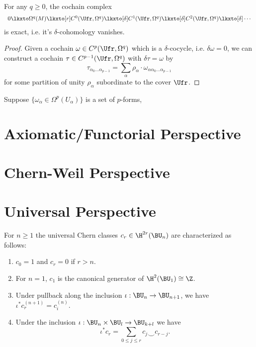 \begin{theorem}
	For any $q \geq 0$, the cochain complex
	\[
		\begin{array}{rcl}
			0 \lkxto \Omega^q(M) \lkxto[r] C^0(\Ufr, \Omega^q) \lkxto[\delta]
			C^1(\Ufr, \Omega^q) \lkxto[\delta] C^2(\Ufr, \Omega^q) \lkxto[\delta]\cdots
		\end{array}
	\]
	is exact, i.e. it's $\delta$-cohomology vanishes.
\end{theorem}

\begin{proof}
	Given a cochain $\omega\in C^p(\Ufr, \Omega^q)$ which is a $\delta$-cocycle, i.e. $\delta \omega = 0$, we can construct a cochain $\tau\in C^{p-1}(\Ufr, \Omega^q)$ with $\delta\tau = \omega$ by
	\[
		\tau_{\alpha_0\ldots\alpha_{p-1}} = \sum_{\alpha}\rho_\alpha\cdot \omega_{\alpha\alpha_0\ldots\alpha_{p-1}}
	\]
	for some partition of unity $\rho_\alpha$ subordinate to the cover $\Ufr$.
\end{proof}

\begin{corollary}
	Suppose $\{\omega_\alpha\in \Omega^p(U_\alpha)\}$ is a set of $p$-forms,
\end{corollary}

\section{Axiomatic/Functorial Perspective}

\section{Chern-Weil Perspective}

\section{Universal Perspective}

\begin{definition}
	For $n\geq 1$ the universal Chern classes $c_r \in \H^{2r}(\BU_n)$
	are characterized as follows:
	\begin{enumerate}
		\item $c_0 = 1$ and $c_r = 0$ if $r > n$.
		\item For $n=1$, $c_1$ is the canonical generator of $\H^2(\BU_1)\cong \Z$.
		\item Under pullback along the inclusion $\iota : \BU_n \to \BU_{n+1}$, we have $\iota^* c_r^{(n+1)} = c_i^{(n)}$.
		\item Under the inclusion $\iota : \BU_n\times \BU_l \to \BU_{k+l}$ we have
		      \[
			      \iota^* c_r = \sum_{0\leq j \leq r} c_j \smile c_{r-j}.
		      \]
	\end{enumerate}
\end{definition}


